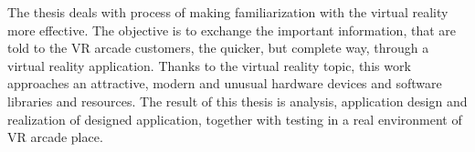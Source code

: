 The thesis deals with process of making familiarization with the virtual
reality more effective. The objective is to exchange the important
information, that are told to the VR arcade customers, the quicker, but
complete way, through a virtual reality application. Thanks to the
virtual reality topic, this work approaches an attractive, modern and
unusual hardware devices and software libraries and resources. The
result of this thesis is analysis, application design and realization of
designed application, together with testing in a real environment of VR
arcade place.
